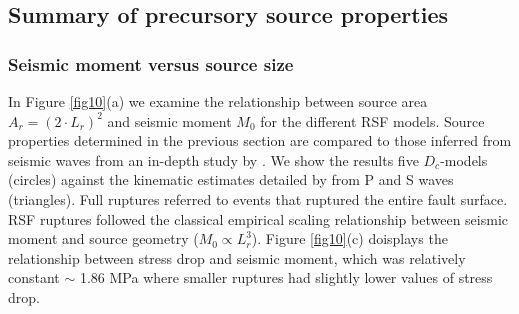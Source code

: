 \documentclass[preprint,1p, 10pt,authoryear]{elsarticle}
\begin{document}
\subsection{Summary of precursory source properties}
\subsubsection{Seismic moment versus source size}
In Figure \ref{fig10}(a) we examine the relationship between source area $A_{r} = (2\cdot L_{r})^{2}$ and seismic moment $M_{0}$ for the different RSF models. Source properties determined in the previous section are compared to those inferred from seismic waves from an in-depth study by \citet{Selvadurai2019}. We show the results five $D_{c}$-models (circles) against the kinematic estimates detailed by \citet{Selvadurai2019} from P and S waves (triangles).  Full ruptures referred to events that ruptured the entire fault surface. RSF ruptures followed the classical empirical scaling relationship between seismic moment and source geometry ($M_{0} \propto L_{r}^{3}$). Figure \ref{fig10}(c) doisplays the relationship between stress drop and seismic moment, which was relatively constant $\sim$ 1.86 MPa where smaller ruptures had slightly lower values of stress drop.
\end{document}
